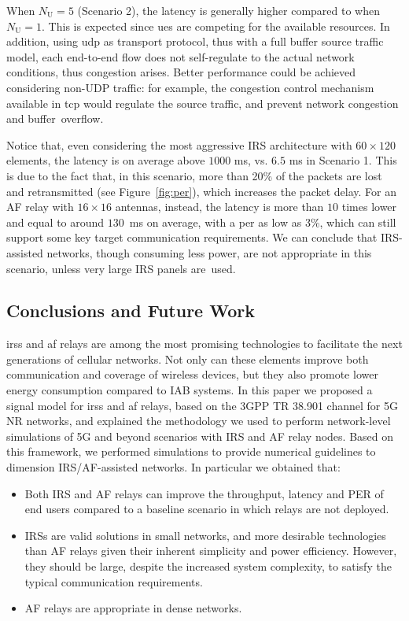 When $N_{\mathrm U}=5$ (Scenario 2), the latency is generally higher compared to when $N_{\mathrm U}=1$. This is expected since \glspl{ue} are competing for the available resources. In addition, using \gls{udp} as transport protocol, thus with a full buffer source traffic model, each end-to-end flow does not self-regulate to the actual network conditions, thus congestion arises. 
Better performance could be achieved considering non-UDP traffic: for example, the congestion control mechanism available in \gls{tcp} would regulate the source traffic, and prevent network congestion and buffer~overflow.

Notice that, even considering the most aggressive IRS architecture with $60\times120$ elements, the latency is on average above $1000$ ms, vs. $6.5$ ms in Scenario 1. 
This is due to the fact that, in this scenario, more than 20\% of the packets are lost and retransmitted (see Figure~\ref{fig:per}), which increases the packet delay.
For an AF relay with $16\times16$ antennas, instead, the latency is more than $10$ times lower and equal to around $130$~ms on average, with a \gls{per} as low as 3\%, which can still support some key target communication requirements.
We can conclude that IRS-assisted networks, though consuming less power, are not appropriate in this scenario, unless very large IRS panels are~used.

\subsection{Conclusions and Future Work}
\label{sec:conclusion}
\Glspl{irs} and \gls{af} relays are among the most promising technologies to facilitate the next generations of cellular networks.
Not only can these elements improve both communication and coverage of wireless devices, but they also promote lower energy consumption compared to IAB systems.
In this paper we proposed a signal model for \glspl{irs} and \gls{af} relays, based on the 3GPP TR 38.901 channel for 5G NR networks, and explained the methodology we used to perform network-level simulations of 5G and beyond scenarios with IRS and AF relay nodes.
Based on this framework, we performed simulations to provide numerical guidelines to dimension IRS/AF-assisted networks. In particular we obtained that:
\begin{itemize}
	\item Both IRS and AF relays can improve the throughput, latency and PER of end users compared to a baseline scenario in which relays are not deployed.
	\item IRSs are valid solutions in small networks, and more desirable technologies than AF relays given their inherent simplicity and power efficiency. However, they should be large, despite the increased system complexity, to satisfy the typical communication requirements.
	\item AF relays are appropriate in dense networks.
\end{itemize}
	